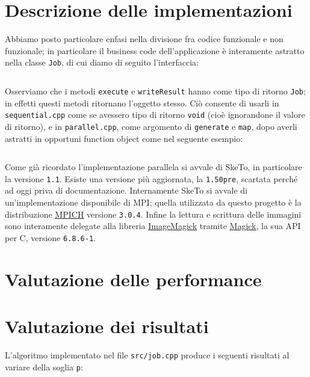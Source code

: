 \documentclass[12pt]{article}
\newcommand{\cpp}{C\nolinebreak\hspace{-.05em}\raisebox{.4ex}{\tiny\bf +}\nolinebreak\hspace{-.10em}\raisebox{.4ex}{\tiny\bf +}}
\newcommand{\mpp}{Magick\nolinebreak\hspace{-.05em}\raisebox{.4ex}{\tiny\bf +}\nolinebreak\hspace{-.10em}\raisebox{.4ex}{\tiny\bf +}}
\begin{document}
    \section{Descrizione delle implementazioni}

    Abbiamo posto particolare enfasi nella divisione fra codice funzionale e
    non funzionale; in particolare il business code dell'applicazione è
    interamente astratto nella classe \texttt{Job}, di cui diamo di seguito
    l'interfaccia:

    \inputminted[]{c++}{src/job.h}

    Osserviamo che i metodi \texttt{execute} e \texttt{writeResult} hanno
    come tipo di ritorno \texttt{Job}; in effetti questi metodi ritornano
    l'oggetto stesso. Ciò consente di usarli in \texttt{sequential.cpp} come
    se avessero tipo di ritorno \texttt{void} (cio\`e ignorandone il valore
    di ritorno), e in \texttt{parallel.cpp}, come argomento di
    \texttt{generate} e \texttt{map}, dopo averli astratti in opportuni
    function object come nel seguente esempio:

    \inputminted[]{c++}{tex/src/function-object.cpp}

    Come gi\`a ricordato l'implementazione parallela si avvale di SkeTo, in
    particolare la versione \texttt{1.1}. Esiste una versione pi\`u aggiornata,
    la \texttt{1.50pre}, scartata perch\'e ad oggi priva di documentazione.
    Internamente SkeTo si avvale di un'implementazione disponibile di MPI;
    quella utilizzata da questo progetto \`e la distribuzione
    \href{http://www.mpich.org}{\underline{MPICH}} versione \texttt{3.0.4}. 
    Infine la lettura e scrittura delle immagini sono interamente delegate alla
    libreria \href{http://www.imagemagick.org/script/index.php}{\underline{ImageMagick}}
    tramite \href{http://www.imagemagick.org/script/magick++.php}{\underline{\mpp}},
    la sua API per \cpp, versione \texttt{6.8.6-1}.

    \section{Valutazione delle performance}

    \section{Valutazione dei risultati}

    L'algoritmo implementato nel file \texttt{src/job.cpp} produce i
    seguenti risultati al variare della soglia \texttt{p}:
\end{document}
